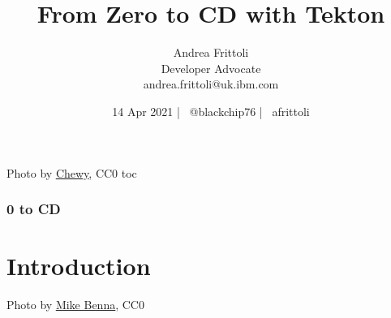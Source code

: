 \documentclass[aspectratio=169,11pt,hyperref={colorlinks=true}]{beamer}
\title{From Zero to CD with Tekton}
\date[14 Apr 2021]{14 Apr 2021 | \faTwitter ~@blackchip76 | \faGithub ~afrittoli}
\author[Andrea Frittoli]{%
  Andrea Frittoli \\
  Developer Advocate \\
  andrea.frittoli@uk.ibm.com \\
}
\begin{document}
\begin{frame}
\titlepage{}
\end{frame}

\begin{lpicrblack}{%
  Photo by \href{https://unsplash.com/@chewy}{\underline{Chewy}}, CC0
  }%
  {%
  \tableofcontents
  }%
  {toc}
  \frametitle{0 to CD}
\end{lpicrblack}

\section[Introduction]{Introduction}

\begin{sectionwithpic}{Photo by \href{https://unsplash.com/@mbenna}{\underline{Mike Benna}}, CC0}
\end{sectionwithpic}
\end{document}
